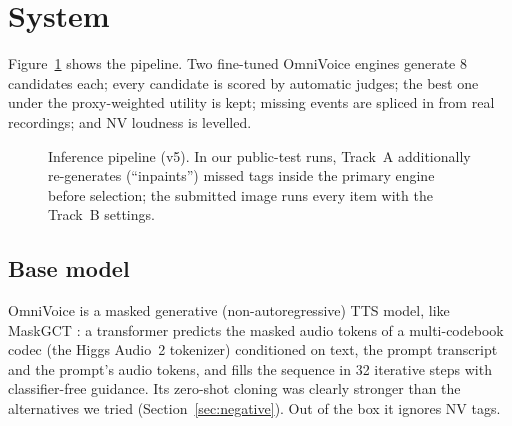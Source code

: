 \documentclass[11pt]{article}
\begin{document}
\section{System}

Figure~\ref{fig:pipeline} shows the pipeline. Two fine-tuned OmniVoice engines generate 8 candidates each; every
candidate is scored by automatic judges; the best one under the proxy-weighted utility is kept; missing events are
spliced in from real recordings; and NV loudness is levelled.

\begin{figure}[t]
\centering
{}
\caption{Inference pipeline (v5). In our public-test runs, Track~A additionally re-generates (``inpaints'') missed tags inside the
primary engine before selection; the submitted image runs every item with the Track~B settings.}
\label{fig:pipeline}
\end{figure}

\subsection{Base model}
OmniVoice \citep{omnivoice} is a masked generative (non-autoregressive) TTS model, like MaskGCT
\citep{wang2024maskgct}: a transformer predicts the masked audio tokens of a multi-codebook codec (the Higgs Audio~2
tokenizer) conditioned on text, the prompt transcript and the prompt's audio tokens, and fills the sequence in 32
iterative steps with classifier-free guidance. Its zero-shot cloning was clearly stronger than the alternatives we tried
(Section~\ref{sec:negative}). Out of the box it ignores NV tags.
\end{document}
